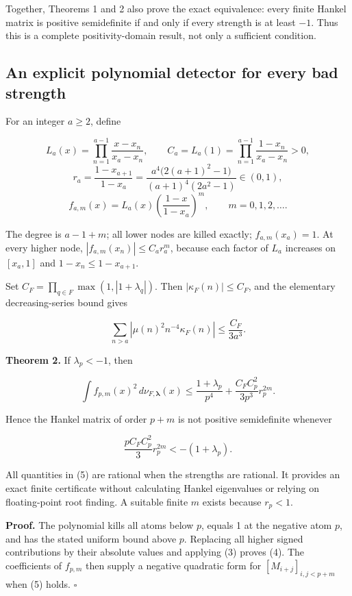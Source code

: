 Together, Theorems 1 and 2 also prove the exact equivalence: every
finite Hankel matrix is positive semidefinite if and only if every
strength is at least \(-1\). Thus this is a complete positivity-domain
result, not only a sufficient condition.

\hypertarget{an-explicit-polynomial-detector-for-every-bad-strength}{%
\subsection{An explicit polynomial detector for every bad
strength}\label{an-explicit-polynomial-detector-for-every-bad-strength}}

For an integer \(a\ge2\), define

\[
L_a(x)=\prod_{n=1}^{a-1}\frac{x-x_n}{x_a-x_n},\qquad
C_a=L_a(1)=\prod_{n=1}^{a-1}\frac{1-x_n}{x_a-x_n}>0,
\] \[
r_a=\frac{1-x_{a+1}}{1-x_a}
=\frac{a^4\bigl(2(a+1)^2-1\bigr)}{(a+1)^4(2a^2-1)}\in(0,1),
\] \[
f_{a,m}(x)=L_a(x)\left(\frac{1-x}{1-x_a}\right)^m,
\qquad m=0,1,2,\ldots.
\tag{2}
\]

The degree is \(a-1+m\); all lower nodes are killed exactly;
\(f_{a,m}(x_a)=1\). At every higher node,
\(|f_{a,m}(x_n)|\le C_a r_a^m\), because each factor of \(L_a\)
increases on \([x_a,1]\) and \(1-x_n\le1-x_{a+1}\).

Set \(C_F=\prod_{q\in F}\max(1,|1+\lambda_q|)\). Then
\(|\kappa_F(n)|\le C_F\), and the elementary decreasing-series bound
gives

\[
\sum_{n>a}|\mu(n)^2n^{-4}\kappa_F(n)|
\le\frac{C_F}{3a^3}.
\tag{3}
\]

\textbf{Theorem 2.} If \(\lambda_p<-1\), then

\[
\int f_{p,m}(x)^2\,d\nu_{F,\boldsymbol\lambda}(x)
\le\frac{1+\lambda_p}{p^4}
+\frac{C_F C_p^2}{3p^3}r_p^{2m}.
\tag{4}
\]

Hence the Hankel matrix of order \(p+m\) is not positive semidefinite
whenever

\[
\boxed{\frac{p C_F C_p^2}{3}r_p^{2m}<-(1+\lambda_p).}
\tag{5}
\]

All quantities in (5) are rational when the strengths are rational. It
provides an exact finite certificate without calculating Hankel
eigenvalues or relying on floating-point root finding. A suitable finite
\(m\) exists because \(r_p<1\).

\textbf{Proof.} The polynomial kills all atoms below \(p\), equals 1 at
the negative atom \(p\), and has the stated uniform bound above \(p\).
Replacing all higher signed contributions by their absolute values and
applying (3) proves (4). The coefficients of \(f_{p,m}\) then supply a
negative quadratic form for \([M_{i+j}]_{i,j<p+m}\) when (5) holds.
\(\square\)

